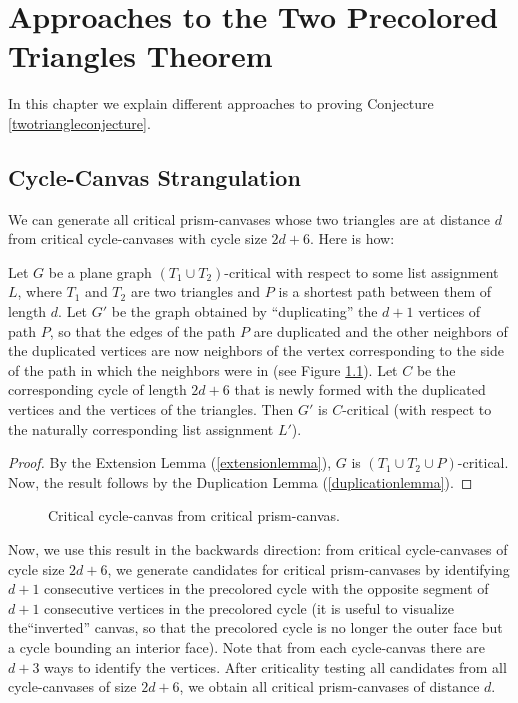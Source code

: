 \chapter{Approaches to the Two Precolored Triangles Theorem}

In this chapter we explain different approaches to proving Conjecture \ref{twotriangleconjecture}.

\section{Cycle-Canvas Strangulation}

We can generate all critical prism-canvases whose two triangles are at distance $d$ from critical
cycle-canvases with cycle size $2d+6$. Here is how:


\begin{proposition}
Let $G$ be a plane graph $(T_1 \cup T_2)$-critical with respect to some list assignment $L$, 
where $T_1$ and $T_2$ are two triangles 
and $P$ is a shortest path between them of length $d$. Let $G'$ be the graph
obtained by ``duplicating'' the $d+1$ vertices of path $P$, so that the edges of the path $P$ are
duplicated and the other neighbors of the duplicated vertices are now neighbors of the vertex
corresponding to the side of the path in which the neighbors were in (see Figure 
\ref{fig:strangulation}). Let $C$ be the corresponding cycle of length $2d+6$ that is newly formed
with the duplicated vertices and the vertices of the triangles. Then $G'$ is $C$-critical (with 
respect to the naturally corresponding list assignment $L'$).
\end{proposition}
\begin{proof}
By the Extension Lemma (\ref{extensionlemma}), $G$ is $(T_1 \cup T_2 \cup P)$-critical.
Now, the result follows by the Duplication Lemma (\ref{duplicationlemma}).
\end{proof}

\begin{figure}
\centering
\begin{tikzpicture}[scale=0.5, every node/.append style={transform shape}]

\end{tikzpicture}
\caption{Critical cycle-canvas from critical prism-canvas.}
\label{fig:strangulation}
\end{figure}

Now, we use this result in the backwards direction:
from critical cycle-canvases of cycle size $2d+6$, we generate candidates for critical 
prism-canvases by identifying $d+1$ consecutive vertices in the precolored cycle with the opposite
segment of $d+1$ consecutive vertices in the precolored cycle (it is useful to visualize 
the``inverted'' canvas, so that the precolored cycle is no longer the outer face but a cycle
bounding an interior face). Note that from each cycle-canvas there are $d+3$ ways to identify
the vertices. After criticality testing all candidates from all cycle-canvases of size $2d+6$, we
obtain all critical prism-canvases of distance $d$.

